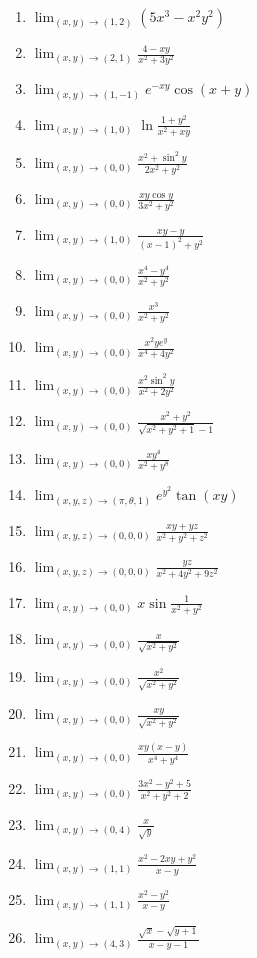 \documentclass[11pt,a4paper]{article}
\newcommand{\limite}{\displaystyle\lim}
\begin{document}
\begin{enumerate}
	\begin{enumerate}
		\item $\limite_{(x,y) \to (1,2)} (5x^3 - x^2y^2)$
		\item $\limite_{(x,y) \to (2,1)} \displaystyle\frac{4 - xy}{x^2 + 3y^2}$
		\item $\limite_{(x,y) \to (1,-1)} e^{-xy}\cos (x + y)$
		\item $\limite_{(x,y) \to (1,0)} \ln \displaystyle\frac{1 + y^2}{x^2 + xy}$
		\item $\limite_{(x,y) \to (0,0)} \displaystyle\frac{x^2 + \sin^2 y}{2x^2 + y^2}$
		\item $\limite_{(x,y) \to (0,0)} \displaystyle\frac{xy\cos y}{3x^2 + y^2}$
		\item $\limite_{(x,y) \to (1,0)} \displaystyle\frac{xy - y}{(x - 1)^2 + y^2}$
		\item $\limite_{(x,y) \to (0,0)} \displaystyle\frac{x^4 - y^4}{x^2 + y^2}$
		\item $\limite_{(x,y) \to (0,0)} \displaystyle\frac{x^3}{x^2 + y^2}$			
		\item $\limite_{(x,y) \to (0,0)} \displaystyle\frac{x^2ye^y}{x^4 + 4y^2}$	
		\item $\limite_{(x,y) \to (0,0)} \displaystyle\frac{x^2\sin^2 y}{x^2 + 2y^2}$	
		\item $\limite_{(x,y) \to (0,0)} \displaystyle\frac{x^2 + y^2}{\sqrt{x^2 + y^2 + 1} - 1}$	
		\item $\limite_{(x,y) \to (0,0)} \displaystyle\frac{xy^4}{x^2 + y^8}$	
		\item $\limite_{(x,y,z) \to (\pi,\theta, 1)} e^{y^2}\tan (xy)$	
		\item $\limite_{(x,y,z) \to (0,0,0)} \displaystyle\frac{xy + yz}{x^2 + y^2 + z^2}$	
		\item $\limite_{(x,y,z) \to (0,0,0)} \displaystyle\frac{yz}{x^2 + 4y^2 + 9z^2}$	
		\item $\limite_{(x,y) \to (0,0)} x\sin \displaystyle\frac{1}{x^2 + y^2}$	
		\item $\limite_{(x,y) \to (0,0)} \displaystyle\frac{x}{\sqrt{x^2 + y^2}}$		
		\item $\limite_{(x,y) \to (0,0)} \displaystyle\frac{x^2}{\sqrt{x^2 + y^2}}$	
		\item $\limite_{(x,y) \to (0,0)} \displaystyle\frac{xy}{\sqrt{x^2 + y^2}}$
		\item $\limite_{(x,y) \to (0,0)} \displaystyle\frac{xy(x-y)}{x^4 + y^4}$	
		\item $\limite_{(x,y) \to (0,0)} \displaystyle\frac{3x^2 - y^2 + 5}{x^2 + y^2 + 2}$	
		\item $\limite_{(x,y) \to (0,4)} \displaystyle\frac{x}{\sqrt{y}}$	
		\item $\limite_{(x,y) \to (1,1)} \displaystyle\frac{x^2 - 2xy + y^2}{x - y}$
		\item $\limite_{(x,y) \to (1,1)} \displaystyle\frac{x^2 - y^2}{x - y}$	
		\item $\limite_{(x,y) \to (4,3)} \displaystyle\frac{\sqrt{x} - \sqrt{y + 1}}{x - y - 1}$
			

\end{enumerate}
\end{enumerate}
\end{document}
